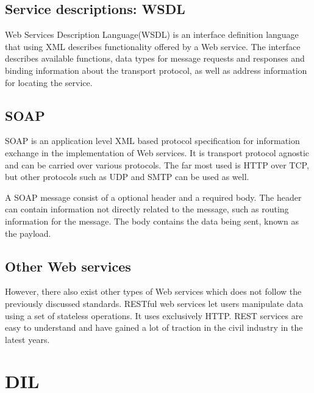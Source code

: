 \documentclass[USenglish]{ifimaster}
\begin{document}
\subsection{Service descriptions: WSDL}
Web Services Description Language(WSDL) is an interface definition language that using XML describes functionality offered by a Web service. The interface describes available functions, data types for message requests and responses and binding information about the transport protocol, as well as address information for locating the service.

\subsection{SOAP}
SOAP is an application level XML based protocol specification for information exchange in the implementation of Web services. It is transport protocol agnostic and can be carried over various protocols. The far most used is HTTP over TCP, but other protocols such as UDP and SMTP can be used as well.

A SOAP message consist of a optional header and a required body. The header can contain information not directly related to the message, such as routing information for the message. The body contains the data being sent, known as the payload.

\subsection{Other Web services}
However, there also exist other types of Web services which does not follow the previously discussed standards. RESTful web services let users manipulate data using a set of stateless operations. It uses exclusively HTTP. REST services are easy to understand and have gained a lot of traction in the civil industry in the latest years.



\section{DIL}
\label{dil}
\end{document}
